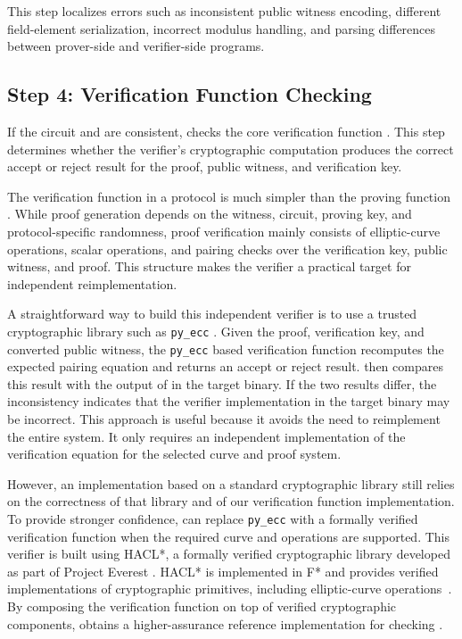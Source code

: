 This step localizes errors such as inconsistent public witness encoding, different field-element serialization, incorrect modulus handling, and parsing differences between prover-side and verifier-side programs.

\subsection{Step 4: Verification Function Checking}

If the circuit and  are consistent, \greyboxfuzz checks the core verification function \vfunc. This step determines whether the verifier's cryptographic computation produces the correct accept or reject result for the proof, public witness, and verification key.

The verification function \vfunc in a \zksnark protocol is much simpler than the proving function \pfunc. While proof generation depends on the witness, circuit, proving key, and protocol-specific randomness, proof verification mainly consists of elliptic-curve operations, scalar operations, and pairing checks over the verification key, public witness, and proof. This structure makes the verifier a practical target for independent reimplementation.

A straightforward way to build this independent verifier is to use a trusted cryptographic library such as \texttt{py\_ecc} \cite{pyecc}. Given the proof, verification key, and converted public witness, the \texttt{py\_ecc} based verification function recomputes the expected pairing equation and returns an accept or reject result. \greyboxfuzz then compares this result with the output of \vfunc in the target binary. If the two results differ, the inconsistency indicates that the verifier implementation in the target binary may be incorrect. This approach is useful because it avoids the need to reimplement the entire \zksnark system. It only requires an independent implementation of the verification equation for the selected curve and proof system.

However, an implementation based on a standard cryptographic library still relies on the correctness of that library and of our verification function implementation. To provide stronger confidence, \greyboxfuzz can replace \texttt{py\_ecc} with a formally verified verification function when the required curve and operations are supported. This verifier is built using HACL*, a formally verified cryptographic library developed as part of Project Everest \cite{zinzindohoue2017hacl,project_everest}. HACL* is implemented in F* and provides verified implementations of cryptographic primitives, including elliptic-curve operations~\cite{zinzindohoue2016verified}. By composing the verification function on top of verified cryptographic components, \greyboxfuzz obtains a higher-assurance reference implementation for checking \vfunc.

